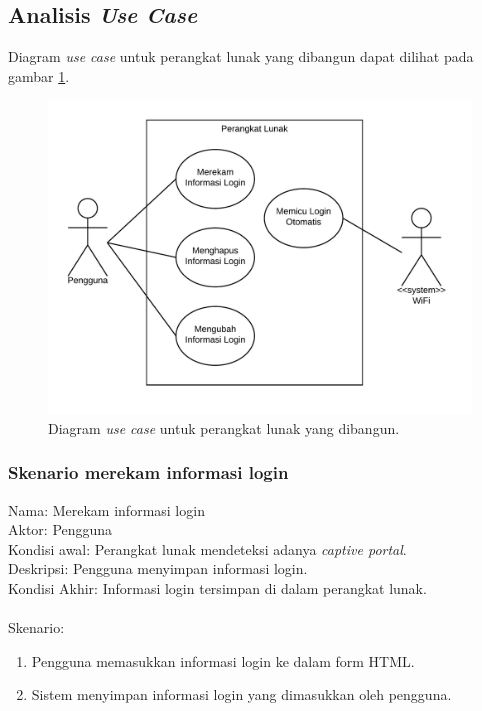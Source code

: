 \subsection{Analisis \textit{Use Case}}
\label{sec:analisis_use_case}

Diagram \textit{use case} untuk perangkat lunak yang dibangun dapat dilihat pada gambar \ref{fig:usecase}.

\begin{figure}[h]
    \centering
    \includegraphics[scale=0.77]{Gambar/usecase.png}
    \caption[Diagram \textit{use case} untuk perangkat lunak yang dibangun.]{Diagram \textit{use case} untuk perangkat lunak yang dibangun.}
    \label{fig:usecase}
\end{figure}

\subsubsection{Skenario merekam informasi login}
Nama: Merekam informasi login\\
Aktor: Pengguna\\
Kondisi awal: Perangkat lunak mendeteksi adanya \textit{captive portal}.\\
Deskripsi: Pengguna menyimpan informasi login.\\
Kondisi Akhir: Informasi login tersimpan di dalam perangkat lunak.\\\\
Skenario:
\begin{enumerate}
    \item{Pengguna memasukkan informasi login ke dalam form HTML.}
    \item{Sistem menyimpan informasi login yang dimasukkan oleh pengguna.}
\end{enumerate}

